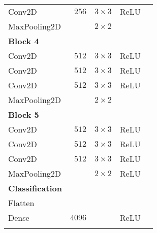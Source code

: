 \begin{table}[H]
\begin{tabular}{lrrrr}
		\rowcolor[HTML]{EFEFEF} 
		Conv2D                  & $256$                     & $3\times3$                & ReLU                &                \\
		MaxPooling2D            &               &          $2\times2$                  &                     &                \\
		\textbf{Block 4}        &                           &                           &                     &                \\
		\rowcolor{lightGrey}  
		Conv2D                  & $512$                     & $3\times3$                & ReLU                &                \\
		Conv2D                  & $512$                     & $3\times3$                & ReLU                &                \\
		\rowcolor{lightGrey}  
		Conv2D                  & $512$                     & $3\times3$                & ReLU                &                \\
		MaxPooling2D            &             &          $2\times2$                  &                     &                \\
		\textbf{Block 5}        &                           &                           &                     &                \\
		\rowcolor{lightGrey}  
		Conv2D                  & $512$                     & $3\times3$                & ReLU                &                \\
		Conv2D                  & $512$                     & $3\times3$                & ReLU                &                \\
		\rowcolor{lightGrey}  
		Conv2D                  & $512$                     & $3\times3$                & ReLU                &                \\
		MaxPooling2D            &               &        $2\times2$        & ReLU                &                \\
		\textbf{Classification} &                           &                           &                     &                \\
		\rowcolor{lightGrey}  
		Flatten                 &                           &                           &                     &                \\
		Dense                   & $4096$                    &                           & ReLU                &                \\
		\rowcolor{lightGrey}  

\end{tabular}
\end{table}
